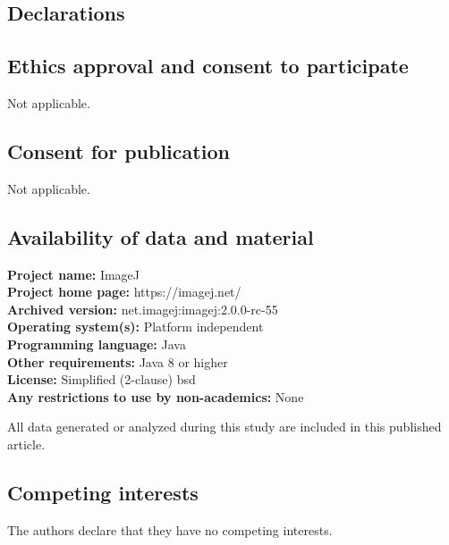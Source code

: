 \documentclass{bmcart}
\begin{document}

\printglossary[title=List of abbreviations,type=\acronymtype,style=long]


\begin{backmatter}

\section*{Declarations}

\subsection*{Ethics approval and consent to participate}
Not applicable.

\subsection*{Consent for publication}
Not applicable.

\subsection*{Availability of data and material}

\textbf{Project name:} ImageJ\\
\textbf{Project home page:} https://imagej.net/\\
\textbf{Archived version:} net.imagej:imagej:2.0.0-rc-55\\
\textbf{Operating system(s):} Platform independent\\
\textbf{Programming language:} Java\\
\textbf{Other requirements:} Java 8 or higher\\
\textbf{License:} Simplified (2-clause) \acrfull{bsd}\\
\textbf{Any restrictions to use by non-academics:} None

All data generated or analyzed during this study are included in this
published article.

\subsection*{Competing interests}
  The authors declare that they have no competing interests.


\end{backmatter}
\end{document}

